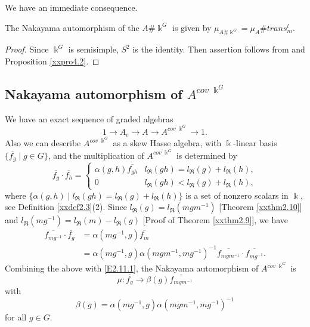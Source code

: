 We have an immediate consequence.

\begin{corollary}
\label{xxcor4.4}
The Nakayama automorphism of the $A\# \Bbbk^G$ is given by
$\mu_{A\# \Bbbk^G} =\mu_A\# trans^l_{m}$.
\end{corollary}

\begin{proof}
Since $\Bbbk^G$ is semisimple, $S^2$ is the identity. Then 
assertion follows from \cite[Theorem 0.2]{RRZ2} 
and Proposition \ref{xxpro4.2}.
\end{proof}

\subsection{Nakayama automorphism of $A^{cov\; \Bbbk^G}$}
\label{xxsec4.3}
We have an exact sequence of graded algebras
$$1\to A_e\to A\to A^{cov\; \Bbbk^G}\to 1.$$
Also we can describe $A^{cov\; \Bbbk^G}$ as a skew Hasse
algebra, with $\Bbbk$-linear basis $\{\overline{f_g}\mid g\in G\}$, 
and the multiplication of $A^{cov\; \Bbbk^G}$ is determined
by 
$$\overline{f_g}\cdot \overline{f_h}
=\begin{cases} \alpha(g,h)\overline{f_{gh}} & {l_{\Re}}(gh)={l_{\Re}}(g)+{l_{\Re}}(h),\\
0& {l_{\Re}}(gh)<{l_{\Re}}(g)+{l_{\Re}}(h),\end{cases}$$
where $\{\alpha(g,h)\mid {l_{\Re}}(gh)={l_{\Re}}(g)+{l_{\Re}}(h)\}$ is a set of 
nonzero scalars in $\Bbbk$, see Definition \ref{xxdef2.3}(2).
Since ${l_{\Re}}(g)={l_{\Re}}(mgm^{-1})$ [Theorem \ref{xxthm2.10}]
and ${l_{\Re}}(mg^{-1})={l_{\Re}}(m)-{l_{\Re}}(g)$ [Proof of Theorem \ref{xxthm2.9}], 
we have 
$$\begin{aligned}
\overline{f_{mg^{-1}}}\cdot \overline{f_g}
&=\alpha(mg^{-1},g) \overline{f_m}\\
&=\alpha(mg^{-1},g) \alpha(mgm^{-1},mg^{-1})^{-1} 
\overline{f_{mgm^{-1}}}\cdot \overline{f_{mg^{-1}}}.
\end{aligned}
$$
Combining the above with \eqref{E2.11.1}, the Nakayama automorphism 
of $A^{cov\; \Bbbk^G}$ is
\begin{equation}
\label{E4.4.1}\tag{E4.4.1}
\mu: \overline{f_g}\to \beta(g) \overline{f_{mgm^{-1}}}
\end{equation}
with 
\begin{equation}
\label{E4.4.2}\tag{E4.4.2}
\beta(g)=\alpha(mg^{-1},g) \alpha(mgm^{-1},mg^{-1})^{-1}
\end{equation} 
for all $g\in G$. 

